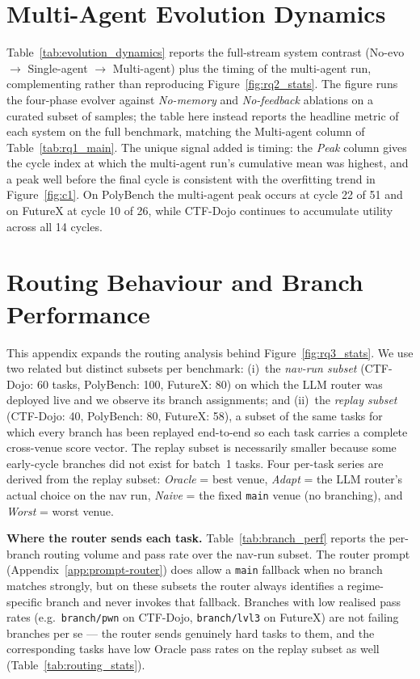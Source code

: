 

\section{Multi-Agent Evolution Dynamics}
\label{app:evolution_dynamics}

Table~\ref{tab:evolution_dynamics} reports the full-stream system contrast (No-evo $\to$ Single-agent $\to$ Multi-agent) plus the timing of the multi-agent run, complementing rather than reproducing Figure~\ref{fig:rq2_stats}. The figure runs the four-phase evolver against \emph{No-memory} and \emph{No-feedback} ablations on a curated subset of samples; the table here instead reports the headline metric of each system on the full benchmark, matching the Multi-agent column of Table~\ref{tab:rq1_main}. The unique signal added is timing: the \emph{Peak} column gives the cycle index at which the multi-agent run's cumulative mean was highest, and a peak well before the final cycle is consistent with the overfitting trend in Figure~\ref{fig:c1}. On PolyBench the multi-agent peak occurs at cycle 22 of 51 and on FutureX at cycle 10 of 26, while CTF-Dojo continues to accumulate utility across all 14 cycles.



\section{Routing Behaviour and Branch Performance}
\label{app:branch_perf}

This appendix expands the routing analysis behind Figure~\ref{fig:rq3_stats}. We use two related but distinct subsets per benchmark: (i)~the \emph{nav-run subset} (CTF-Dojo: 60 tasks, PolyBench: 100, FutureX: 80) on which the LLM router was deployed live and we observe its branch assignments; and (ii)~the \emph{replay subset} (CTF-Dojo: 40, PolyBench: 80, FutureX: 58), a subset of the same tasks for which every branch has been replayed end-to-end so each task carries a complete cross-venue score vector. The replay subset is necessarily smaller because some early-cycle branches did not exist for batch~1 tasks. Four per-task series are derived from the replay subset: \emph{Oracle} = best venue, \emph{Adapt} = the LLM router's actual choice on the nav run, \emph{Naive} = the fixed \texttt{main} venue (no branching), and \emph{Worst} = worst venue.

\noindent\textbf{Where the router sends each task.}
Table~\ref{tab:branch_perf} reports the per-branch routing volume and pass rate over the nav-run subset. The router prompt (Appendix~\ref{app:prompt-router}) does allow a \texttt{main} fallback when no branch matches strongly, but on these subsets the router always identifies a regime-specific branch and never invokes that fallback. Branches with low realised pass rates (e.g.\ \texttt{branch/pwn} on CTF-Dojo, \texttt{branch/lvl3} on FutureX) are not failing branches per se --- the router sends genuinely hard tasks to them, and the corresponding tasks have low Oracle pass rates on the replay subset as well (Table~\ref{tab:routing_stats}).

